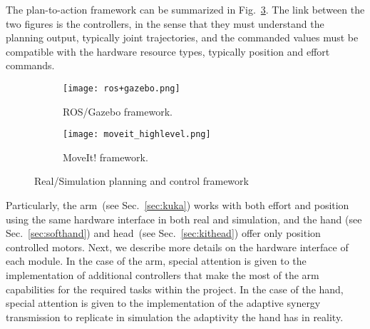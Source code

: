 The plan-to-action framework can be summarized in Fig.~\ref{fig:framework}. The link between the two figures is the controllers, in the sense that they must understand the planning output, typically joint trajectories, and the commanded values must be compatible with the hardware resource types, typically position and effort commands.

\begin{figure}
\centering
\begin{subfigure}[t]{0.58\textwidth}
\centerline{\texttt{[image: ros+gazebo.png]}}
\caption{ROS/Gazebo framework.}
\label{fig:rosgazebointeraction}
\end{subfigure}
\begin{subfigure}[t]{0.4\textwidth}
\centerline{\texttt{[image: moveit\_highlevel.png]}}
\caption{MoveIt! framework.}
\label{fig:planning}
\end{subfigure}
\caption{Real/Simulation planning and control framework}
\label{fig:framework}
\end{figure}

Particularly, the arm~(see Sec.~\ref{sec:kuka}) works with both effort and position using the same hardware interface in both real and simulation, and the hand (see Sec.~\ref{sec:softhand}) and head~(see Sec.~\ref{sec:kithead}) offer only position controlled motors. Next, we describe more details on the hardware interface of each module. In the case of the arm, special attention is given to the implementation of additional controllers that make the most of the arm capabilities for the required tasks within the project. In the case of the hand, special attention is given to the implementation of the adaptive synergy transmission to replicate in simulation the adaptivity the hand has in reality.
